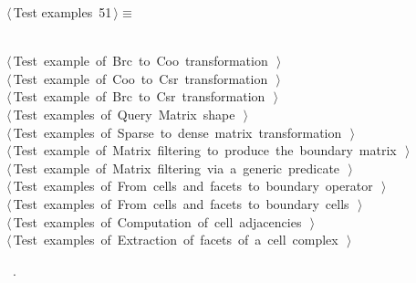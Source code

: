 \documentclass[11pt,oneside]{article}	%
\begin{document}
\begin{flushleft} \small \label{scrap83}
\protect{}$\langle\,$Test examples\nobreak\ {\footnotesize 51}$\,\rangle\equiv$
\vspace{-1ex}
\begin{list}{}{} \item
\mbox{}\verb@@\\
\mbox{}\verb@@\hbox{$\langle\,$Test example of Brc to Coo transformation\nobreak\ {\footnotesize {}}$\,\rangle$}\verb@@\\
\mbox{}\verb@@\hbox{$\langle\,$Test example of Coo to Csr transformation\nobreak\ {\footnotesize {}}$\,\rangle$}\verb@@\\
\mbox{}\verb@@\hbox{$\langle\,$Test example of Brc to Csr transformation\nobreak\ {\footnotesize {}}$\,\rangle$}\verb@@\\
\mbox{}\verb@@\hbox{$\langle\,$Test examples of Query Matrix shape\nobreak\ {\footnotesize {}}$\,\rangle$}\verb@@\\
\mbox{}\verb@@\hbox{$\langle\,$Test examples of Sparse to dense matrix transformation\nobreak\ {\footnotesize {}}$\,\rangle$}\verb@@\\
\mbox{}\verb@@\hbox{$\langle\,$Test example of Matrix filtering to produce the boundary matrix\nobreak\ {\footnotesize {}}$\,\rangle$}\verb@@\\
\mbox{}\verb@@\hbox{$\langle\,$Test example of Matrix filtering via a generic predicate\nobreak\ {\footnotesize {}}$\,\rangle$}\verb@@\\
\mbox{}\verb@@\hbox{$\langle\,$Test examples of From cells and facets to boundary operator\nobreak\ {\footnotesize {}}$\,\rangle$}\verb@@\\
\mbox{}\verb@@\hbox{$\langle\,$Test examples of From cells and facets to boundary cells\nobreak\ {\footnotesize {}}$\,\rangle$}\verb@@\\
\mbox{}\verb@@\hbox{$\langle\,$Test examples of Computation of cell adjacencies\nobreak\ {\footnotesize {}}$\,\rangle$}\verb@@\\
\mbox{}\verb@@\hbox{$\langle\,$Test examples of Extraction of facets of a cell complex\nobreak\ {\footnotesize {}}$\,\rangle$}\verb@@\\
\mbox{}\verb@@{\NWsep}
\end{list}
\vspace{-1ex}
\footnotesize\addtolength{\baselineskip}{-1ex}
\begin{list}{}{\setlength{\itemsep}{-\parsep}\setlength{\itemindent}{-\leftmargin}}
\item \NWtxtMacroRefIn\ .
\end{list}
\end{flushleft}
\end{document}
